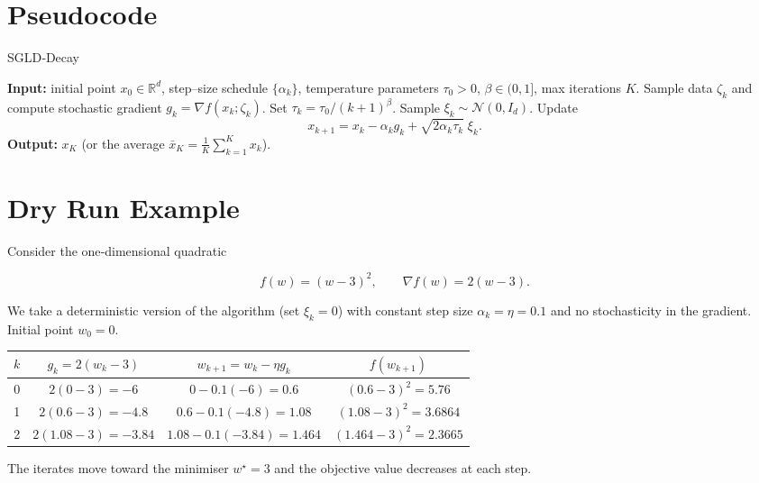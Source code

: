 \documentclass{article}
\newcommand{\R}{\mathbb{R}}
\begin{document}
\section*{Pseudocode}
\begin{algorithm}[H]
\caption{SGLD‑Decay}
\begin{algorithmic}[1]
\State \textbf{Input:} initial point $x_{0}\in\R^{d}$, step–size schedule $\{\alpha_{k}\}$, temperature parameters $\tau_{0}>0$, $\beta\in(0,1]$, max iterations $K$.
    \State Sample data $\zeta_{k}$ and compute stochastic gradient $g_{k}= \nabla f(x_{k};\zeta_{k})$.
    \State Set $\tau_{k}= \tau_{0}/(k+1)^{\beta}$.
    \State Sample $\xi_{k}\sim\mathcal N(0,I_{d})$.
    \State Update 
    \[
    x_{k+1}=x_{k}-\alpha_{k} g_{k}+ \sqrt{2\alpha_{k}\tau_{k}}\;\xi_{k}.
    \]
\EndFor
\State \textbf{Output:} $x_{K}$ (or the average $\bar x_{K}= \frac{1}{K}\sum_{k=1}^{K}x_{k}$).
\end{algorithmic}
\end{algorithm}

\section*{Dry Run Example}
Consider the one‑dimensional quadratic  

\[
f(w)= (w-3)^{2},\qquad \nabla f(w)=2(w-3).
\]

We take a deterministic version of the algorithm (set $\xi_{k}=0$) with constant step size 
$\alpha_{k}= \eta =0.1$ and no stochasticity in the gradient.  
Initial point $w_{0}=0$.

\begin{center}
\begin{tabular}{c|c|c|c}
$k$ & $g_{k}=2(w_{k}-3)$ & $w_{k+1}=w_{k}-\eta g_{k}$ & $f(w_{k+1})$\\ \hline
0 & $2(0-3)=-6$ & $0-0.1(-6)=0.6$ & $(0.6-3)^{2}=5.76$\\
1 & $2(0.6-3)=-4.8$ & $0.6-0.1(-4.8)=1.08$ & $(1.08-3)^{2}=3.6864$\\
2 & $2(1.08-3)=-3.84$ & $1.08-0.1(-3.84)=1.464$ & $(1.464-3)^{2}=2.3665$
\end{tabular}
\end{center}

The iterates move toward the minimiser $w^{\star}=3$ and the objective value decreases at each step.
\end{document}
